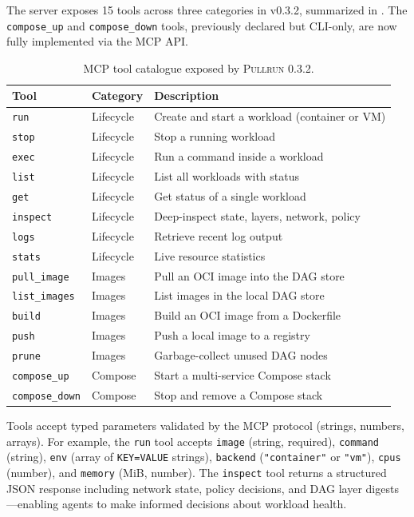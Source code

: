 \documentclass[11pt,a4paper]{article}
\newcommand{\pullrun}{\textsc{Pullrun}}
\begin{document}
The server exposes 15 tools across three categories in v0.3.2, summarized in . The \texttt{compose\_up} and \texttt{compose\_down} tools, previously declared but CLI-only, are now fully implemented via the MCP API.

\begin{table}[htbp]
    \centering
    \caption{MCP tool catalogue exposed by \pullrun{} 0.3.2.}
    \label{tab:mcp-tools}
    \begin{tabular}{@{}llp{5.5cm}@{}}
        \toprule
        \textbf{Tool} & \textbf{Category} & \textbf{Description} \\
        \midrule
        \texttt{run} & Lifecycle & Create and start a workload (container or VM) \\
        \texttt{stop} & Lifecycle & Stop a running workload \\
        \texttt{exec} & Lifecycle & Run a command inside a workload \\
        \texttt{list} & Lifecycle & List all workloads with status \\
        \texttt{get} & Lifecycle & Get status of a single workload \\
        \texttt{inspect} & Lifecycle & Deep-inspect state, layers, network, policy \\
        \texttt{logs} & Lifecycle & Retrieve recent log output \\
        \texttt{stats} & Lifecycle & Live resource statistics \\
        \texttt{pull\_image} & Images & Pull an OCI image into the DAG store \\
        \texttt{list\_images} & Images & List images in the local DAG store \\
        \texttt{build} & Images & Build an OCI image from a Dockerfile \\
        \texttt{push} & Images & Push a local image to a registry \\
        \texttt{prune} & Images & Garbage-collect unused DAG nodes \\
        \texttt{compose\_up} & Compose & Start a multi-service Compose stack \\
        \texttt{compose\_down} & Compose & Stop and remove a Compose stack \\
        \bottomrule
    \end{tabular}
\end{table}

Tools accept typed parameters validated by the MCP protocol (strings, numbers, arrays). For example, the \texttt{run} tool accepts \texttt{image} (string, required), \texttt{command} (string), \texttt{env} (array of \texttt{KEY=VALUE} strings), \texttt{backend} (\texttt{"container"} or \texttt{"vm"}), \texttt{cpus} (number), and \texttt{memory} (MiB, number). The \texttt{inspect} tool returns a structured JSON response including network state, policy decisions, and DAG layer digests---enabling agents to make informed decisions about workload health.
\end{document}
